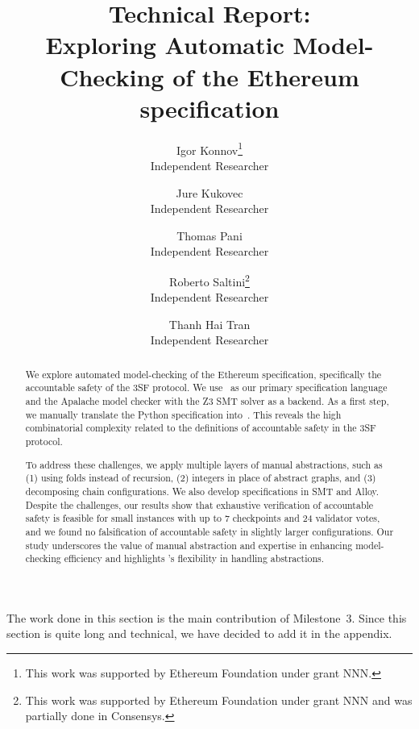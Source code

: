 \documentclass[12pt]{article}
\title{Technical Report:\\
       Exploring Automatic Model-Checking of the Ethereum specification}
\author{%
    Igor Konnov\thanks{This work was supported by Ethereum Foundation
    under grant NNN.}\\ \small Independent Researcher \\
    \and
    Jure Kukovec\footnotemark[1] \\ \small Independent Researcher \\
    \and
    Thomas Pani\footnotemark[1] \\ \small Independent Researcher \\
    \and
    Roberto Saltini\thanks{This work was supported by Ethereum Foundation
    under grant NNN and was partially done in Consensys.} \\ \small Independent Researcher \\
    \and
    Thanh Hai Tran\footnotemark[2] \\ \small Independent Researcher
}
\date{}
\begin{document}
\maketitle

\begin{abstract}

We explore automated model-checking of the Ethereum specification, specifically
the accountable safety of the 3SF protocol. We use~\tlap{} as our primary
specification language and the Apalache model checker with the Z3 SMT solver as
a backend. As a first step, we manually translate the Python specification
into~\tlap{}. This reveals the high combinatorial complexity related to the
definitions of accountable safety in the 3SF protocol.

To address these challenges, we apply multiple layers of manual abstractions,
such as (1) using folds instead of recursion, (2) integers in place of abstract
graphs, and (3) decomposing chain configurations. We also develop
specifications in SMT and Alloy. Despite the challenges, our results show that
exhaustive verification of accountable safety is feasible for small
instances with up to 7 checkpoints and 24 validator votes, and we found no
falsification of accountable safety in slightly larger configurations. Our
study underscores the value of manual abstraction and expertise in enhancing
model-checking efficiency and highlights \tlap{}'s flexibility in handling
abstractions.

\end{abstract}

\setcounter{tocdepth}{2}  %
\tableofcontents

















\pagebreak

\appendix

The work done in this section is the main contribution of Milestone~3. Since
this section is quite long and technical, we have decided to add it in the
appendix.




\end{document}
